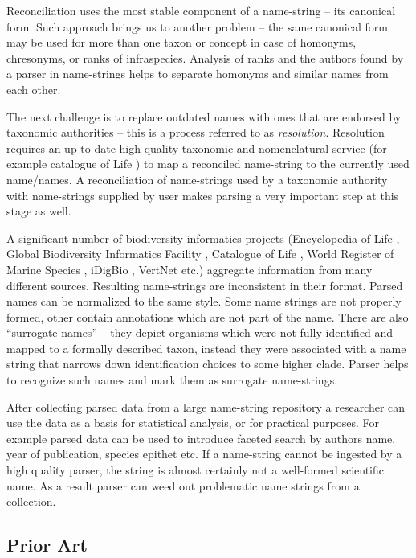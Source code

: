 \documentclass{bmcart}
\begin{document}
Reconciliation uses the most stable component of a name-string -- its canonical
form. Such approach brings us to another problem -- the same canonical form may
be used for more than one taxon or concept in case of homonyms, chresonyms, or
ranks of infraspecies. Analysis of ranks and the authors found by a
parser in name-strings helps to separate homonyms and similar names from each
other.

The next challenge is to replace outdated names with ones that are endorsed by
taxonomic authorities -- this is a process referred to as \textit{resolution}.
Resolution requires an up to date high quality taxonomic and nomenclatural
service (for example catalogue of Life \cite{col}) to map a reconciled
name-string to the currently used name/names. A reconciliation of name-strings
used by a taxonomic authority with name-strings supplied by user makes parsing
a very important step at this stage as well.

A significant number of biodiversity informatics projects (Encyclopedia of Life
\cite{eol}, Global Biodiversity Informatics Facility \cite{gbif}, Catalogue of
Life \cite{col}, World Register of Marine Species \cite{worms}, iDigBio
\cite{idigbio}, VertNet \cite{vertnet} etc.) aggregate information from many
different sources.  Resulting name-strings are inconsistent in their format.
Parsed names can be normalized to the same style. Some name strings are not
properly formed, other contain annotations which are not part of the name.
There are also “surrogate names” -- they depict organisms which were not fully
identified and mapped to a formally described taxon, instead they were
associated with a name string that narrows down identification choices to some
higher clade. Parser helps to recognize such names and mark them as surrogate
name-strings.

After collecting parsed data from a large name-string repository a researcher
can use the data as a basis for statistical analysis, or for practical
purposes. For example parsed data can be used to introduce faceted search by
authors name, year of publication, species epithet etc. If a name-string cannot
be ingested by a high quality parser, the string is almost certainly not a
well-formed scientific name. As a result parser can weed out problematic name
strings from a collection.

\subsection*{Prior Art}
\end{document}
